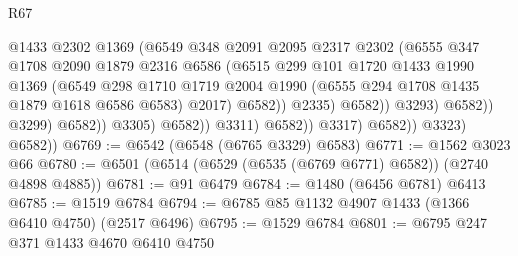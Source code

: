 \begin{lexlean}{R67}
\begin{coremodule}
                                            @1433
                                            @2302
                                            @1369
                                            (@6549
                                              @348
                                              @2091
                                              @2095
                                              @2317
                                              @2302
                                              (@6555
                                                @347
                                                @1708
                                                @2090
                                                @1879
                                                @2316
                                                @6586
                                                (@6515
                                                  @299
                                                  @101
                                                  @1720
                                                  @1433
                                                  @1990
                                                  @1369
                                                  (@6549
                                                    @298
                                                    @1710
                                                    @1719
                                                    @2004
                                                    @1990
                                                    (@6555 @294 @1708 @1435 @1879 @1618 @6586 @6583)
                                                    @2017)
                                                  @6582))
                                              @2335)
                                            @6582))
                                        @3293)
                                      @6582))
                                  @3299)
                                @6582))
                            @3305)
                          @6582))
                      @3311)
                    @6582))
                @3317)
              @6582))
          @3323)
        @6582))
@6769 := @6542 (@6548 (@6765 @3329) @6583)
@6771 := @1562 @3023 @66
@6780 := @6501 (@6514 (@6529 (@6535 (@6769 @6771) @6582)) (@2740 @4898 @4885))
@6781 := @91 @6479
@6784 := @1480 (@6456 @6781) @6413
@6785 := @1519 @6784
@6794 := @6785 @85 @1132 @4907 @1433 (@1366 @6410 @4750) (@2517 @6496)
@6795 := @1529 @6784
@6801 := @6795 @247 @371 @1433 @4670 @6410 @4750

\end{coremodule}
\end{lexlean}
